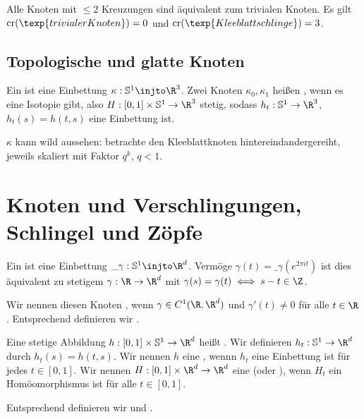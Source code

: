 \begin{ex}
    Alle Knoten mit $\le 2$ Kreuzungen sind äquivalent zum trivialen Knoten.
    Es gilt $\Cr(\texp{trivialer Knoten}) = 0$ und $\Cr(\texp{Kleeblattschlinge}) = 3$.
\end{ex}

\subsection{Topologische und glatte Knoten}

\begin{df}
    Ein  ist eine Einbettung $\kappa: \S^1 \injto \R^3$.
    Zwei Knoten $\kappa_0, \kappa_1$ heißen , wenn es eine Isotopie gibt, also $H: [0,1] \times \S^1 \to \R^3$ stetig, sodass $h_t: \S^1 \to \R^3$, $h_t(s) = h(t,s)$ eine Einbettung ist.
\end{df}

\begin{note}
    $\kappa$ kann wild aussehen: betrachte den Kleeblattknoten hintereindandergereiht, jeweils skaliert mit Faktor $q^k$, $q < 1$.
\end{note}



\section{Knoten und Verschlingungen, Schlingel und Zöpfe}

\begin{df}
    Ein  ist eine Einbettung $\_\gamma: \S^1 \injto \R^d$.
    Vermöge $\gamma(t) = \_\gamma(e^{2\pi i t})$ ist dies äquivalent zu stetigem $\gamma: \R \to \R^d$ mit $\gamma(s) = \gamma(t) \iff s - t \in \Z$.

    Wir nennen diesen Knoten , wenn $\gamma \in C^1(\R, \R^d)$ und $\gamma'(t) \neq 0$ für alle $t \in \R$.
    Entsprechend definieren wir .
\end{df}

\begin{df}
    Eine stetige Abbildung $h: [0,1] \times \S^1 \to \R^d$ heißt .
    Wir definieren $h_t: \S^1 \to \R^d$ durch $h_t(s) = h(t,s)$.
    Wir nennen $h$ eine , wennn $h_t$ eine Einbettung ist für jedes $t \in [0,1]$.
    Wir nennen $H: [0,1] \times \R^d \to \R^d$ eine  (oder ), wenn $H_t$ ein Homöomorphismus ist für alle $t \in [0,1]$.

    Entsprechend definieren wir  und .
\end{df}

